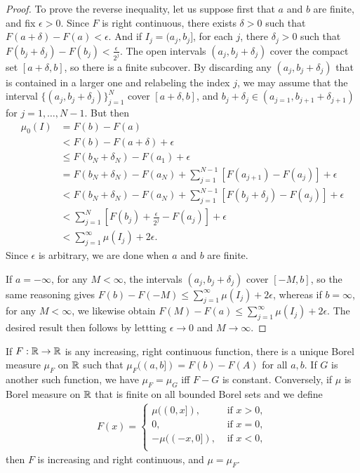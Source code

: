 \begin{proof}
    To prove the reverse inequality, let us suppose first that $a$ and $b$ are finite, and fix $\epsilon > 0$. 
    Since $F$ is right continuous, there exists $\delta > 0$ such that $F(a+\delta) - F(a) < \epsilon$.
    And if $I_j = (a_j, b_j]$, for each $j$, there $\delta_j > 0$ such that $F(b_j+\delta_j) - F(b_j) < \frac{\epsilon}{2^j}$.
    The open intervals $(a_j, b_j + \delta_j)$ cover the compact set $[a+\delta, b]$, so there is a finite subcover.
    By discarding any $(a_j, b_j + \delta_j)$ that is contained in a larger one and relabeling the index $j$, we may assume that the interval $\{(a_j, b_j+\delta_j)\}_{j=1}^{N}$ cover $[a+\delta, b]$, and $b_j + \delta_j \in (a_{j=1}, b_{j+1}+\delta_{j+1})$ for $j = 1, \dots, N-1$.
    But then 
    \begin{align}
        \mu_0(I) & = F(b) - F(a) \\
        & < F(b) - F(a+\delta) + \epsilon \\
        & \le F(b_N + \delta_N) - F(a_1) + \epsilon \\
        & = F(b_N + \delta_N) - F(a_N) + \sum_{j=1}^{N-1} [F(a_{j+1}) - F(a_j)] + \epsilon \\
        & < F(b_N + \delta_N) - F(a_N) + \sum_{j=1}^{N-1} [F(b_j+\delta_j) - F(a_j)] + \epsilon \\
        & < \sum_{j=1}^{N} [F(b_j) + \frac{\epsilon}{2^j} - F(a_j)] + \epsilon \\
        & < \sum_{j=1}^{\infty} \mu(I_j) + 2 \epsilon.
    \end{align}
    Since $\epsilon$ is arbitrary, we are done when $a$ and $b$ are finite.

    If $a = -\infty$, for any $M < \infty$, the intervals $(a_j, b_j + \delta_j)$ cover $[-M, b]$, so the same reasoning gives $F(b) - F(-M) \le \sum_{j=1}^{\infty} \mu(I_j) + 2 \epsilon$, whereas if $b = \infty$, for any $M < \infty$, we likewise obtain $F(M) - F(a)\le \sum_{j=1}^{\infty} \mu(I_j) + 2 \epsilon$.
    The desired result then follows by lettting $\epsilon \to 0$ and $M \to \infty$.
\end{proof}

\begin{theorem}
    If $F: \mathbb{R} \to \mathbb{R}$ is any increasing, right continuous function, there is a unique Borel measure $\mu_F$ on $\mathbb{R}$ such that $\mu_F ((a,b]) = F(b) - F(A)$ for all $a, b$.
    If $G$ is another such function, we have $\mu_F = \mu_G$ iff $F-G$ is constant.
    Conversely, if $\mu$ is Borel measure on $\mathbb{R}$ that is finite on all bounded Borel sets and we define
    \begin{align}
        F(x) = \begin{cases}
            \mu((0, x]), & \text{ if } x > 0, \\
            0, & \text{ if } x = 0,\\
            -\mu((-x, 0]), & \text{ if } x < 0, \\
        \end{cases}
    \end{align}
    then $F$ is increasing and right continuous, and $\mu = \mu_F$.
\end{theorem}

